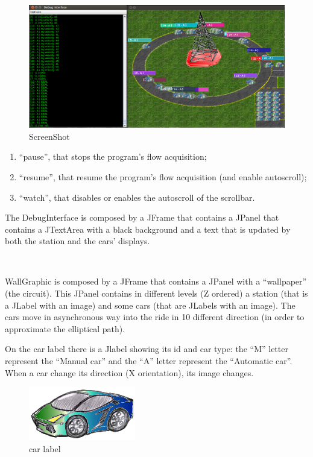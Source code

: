 \documentclass[a4paper,titlepage]{article}
\begin{document}
\begin{figure}[!h]
\centering
\includegraphics[scale=0.3]{screen.png}
\caption{ScreenShot}
\end{figure}

\begin {enumerate}

\item ``pause'', that stops the program's flow acquisition;

\item ``resume'', that resume the program's flow acquisition (and enable autoscroll);

\item ``watch'', that disables or enables the autoscroll of the scrollbar.    

\end{enumerate}


The DebugInterface is composed by a JFrame that contains a JPanel that contains a JTextArea with a black background and a text that is updated by both the station and the cars' displays.

~

WallGraphic is composed by a JFrame that contains a JPanel with a ``wallpaper'' (the circuit). This JPanel contains in different levels (Z ordered) a station (that is a JLabel with an image) and some cars (that are JLabels with an image). The cars move in asynchronous way into the ride in 10 different direction (in order to approximate the elliptical path).

On the car label there is a Jlabel showing its id and car type: the ``M'' letter represent the ``Manual car'' and the ``A'' letter represent the ``Automatic car''. When a car change its direction (X orientation), its image changes.

\begin{figure}[!ht]
\centering
\includegraphics[scale=0.2]{../car.png}
\caption{car label}
\end{figure}
\end{document}
